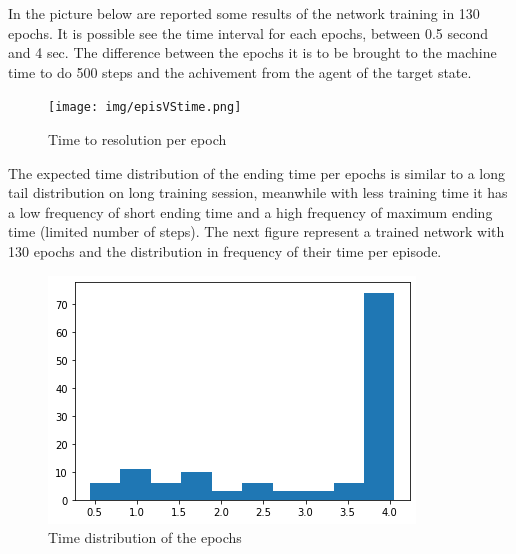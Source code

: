 In the picture below are reported some results of the network training in 130 epochs. It is possible see the time interval for each epochs, between 0.5 second and 4 sec. The difference between the epochs it is to be brought to the machine time to do 500 steps and the achivement from the agent of the target state.

\begin{figure}[h]
    \centering
    \texttt{[image: img/episVStime.png]}
    \caption{Time to resolution per epoch}
    \label{fig:my_label}
\end{figure}

The expected time distribution of the ending time per epochs is similar to a 
long tail distribution on long training session, meanwhile with less training 
time it has a low frequency of short ending time and a high frequency of maximum
ending time (limited number of steps). The next figure represent a trained network 
with 130 epochs and the distribution in frequency of their time per episode.

\begin{figure}[h]
    \centering
    \includegraphics{img/histTimeEps.png}
    \caption{Time distribution of the epochs}
    \label{fig:my_label}
\end{figure}
